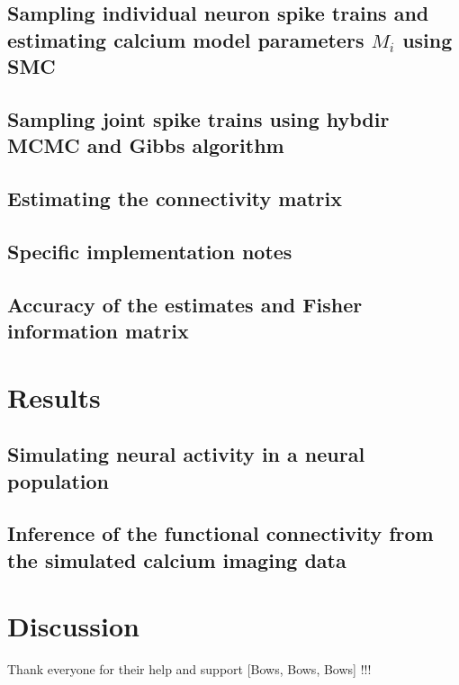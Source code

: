 \documentclass[amsmath, amssymb]{revtex4}
\begin{document}
\subsection{Sampling individual neuron spike trains and estimating calcium model parameters $M_i$ using SMC}
\label{sec:methods:sampling_neuron}


\clearpage
\subsection{Sampling joint spike trains using hybdir MCMC and Gibbs algorithm}
\label{sec:methods:sampling HMM}


\subsection{Estimating the connectivity matrix} %
\label{sec:methods:parameters HMM}


\subsection{Specific implementation notes}
\label{sec:methods:specific_implementation}


\subsection{Accuracy of the estimates and Fisher information matrix}
\label{sec:methods:accuracy_Fisher}


\section{Results}
\label{results}

\subsection{Simulating neural activity in a neural population}
\label{sec:results:simulations}


\subsection{Inference of the functional connectivity from the simulated calcium imaging data}
\label{sec:results:inference}


\section{Discussion}
\label{discussion}


\begin{acknowledgments}
Thank everyone for their help and support [Bows, Bows, Bows] !!!
\end{acknowledgments}



\end{document}
